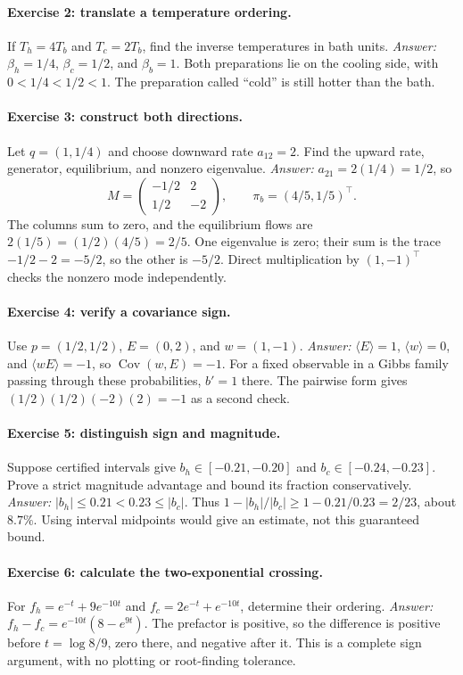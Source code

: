\documentclass[11pt]{article}
\newcommand{\Cov}{\operatorname{Cov}}
\begin{document}
\paragraph{Exercise 2: translate a temperature ordering.}
If $T_h=4T_b$ and $T_c=2T_b$, find the inverse temperatures in bath units.
\emph{Answer:} $\beta_h=1/4$, $\beta_c=1/2$, and $\beta_b=1$.
Both preparations lie on the cooling side, with $0<1/4<1/2<1$.
The preparation called ``cold'' is still hotter than the bath.

\paragraph{Exercise 3: construct both directions.}
Let $q=(1,1/4)$ and choose downward rate $a_{12}=2$. Find the upward rate,
generator, equilibrium, and nonzero eigenvalue. \emph{Answer:}
$a_{21}=2(1/4)=1/2$, so
\[
M=\begin{pmatrix}-1/2&2\\1/2&-2\end{pmatrix},
\qquad \pi_b=(4/5,1/5)^\top.
\]
The columns sum to zero, and the equilibrium flows are
$2(1/5)=(1/2)(4/5)=2/5$. One eigenvalue is zero; their sum is the trace
$-1/2-2=-5/2$, so the other is $-5/2$. Direct multiplication by $(1,-1)^\top$
checks the nonzero mode independently.

\paragraph{Exercise 4: verify a covariance sign.}
Use $p=(1/2,1/2)$, $E=(0,2)$, and $w=(1,-1)$.
\emph{Answer:} $\langle E\rangle=1$, $\langle w\rangle=0$, and
$\langle wE\rangle=-1$, so $\Cov(w,E)=-1$. For a fixed observable in a
Gibbs family passing through these probabilities, $b'=1$ there. The
pairwise form gives $(1/2)(1/2)(-2)(2)=-1$ as a second check.

\paragraph{Exercise 5: distinguish sign and magnitude.}
Suppose certified intervals give $b_h\in[-0.21,-0.20]$ and
$b_c\in[-0.24,-0.23]$. Prove a strict magnitude advantage and bound its
fraction conservatively. \emph{Answer:} $|b_h|\leq0.21<0.23\leq|b_c|$.
Thus $1-|b_h|/|b_c|\geq1-0.21/0.23=2/23$, about $8.7\%$.
Using interval midpoints would give an estimate, not this guaranteed bound.

\paragraph{Exercise 6: calculate the two-exponential crossing.}
For $f_h=e^{-t}+9e^{-10t}$ and $f_c=2e^{-t}+e^{-10t}$, determine their
ordering. \emph{Answer:} $f_h-f_c=e^{-10t}(8-e^{9t})$.
The prefactor is positive, so the difference is positive before
$t=\log8/9$, zero there, and negative after it. This is a complete sign
argument, with no plotting or root-finding tolerance.
\end{document}
